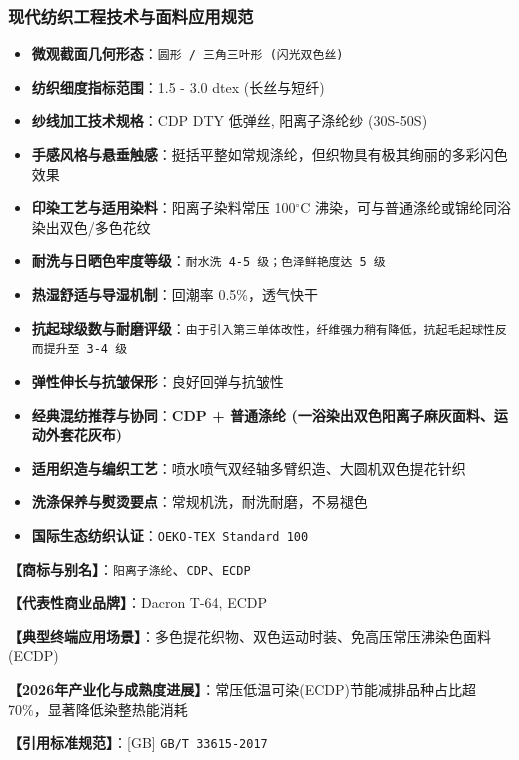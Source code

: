 \documentclass[11pt,openright,twoside,UTF8]{ctexbook}
\begin{document}
\subsubsection*{现代纺织工程技术与面料应用规范}
\begin{itemize} \setlength{\itemsep}{2pt}
    \item \textbf{微观截面几何形态}：\texttt{圆形 / 三角三叶形 (闪光双色丝)}
    \item \textbf{纺织细度指标范围}：1.5 - 3.0 dtex (长丝与短纤)
    \item \textbf{纱线加工技术规格}：CDP DTY 低弹丝, 阳离子涤纶纱 (30S-50S)
    \item \textbf{手感风格与悬垂触感}：挺括平整如常规涤纶，但织物具有极其绚丽的多彩闪色效果
    \item \textbf{印染工艺与适用染料}：阳离子染料常压 100$^\circ\mathrm{C}$ 沸染，可与普通涤纶或锦纶同浴染出双色/多色花纹
    \item \textbf{耐洗与日晒色牢度等级}：\texttt{耐水洗 4-5 级；色泽鲜艳度达 5 级}
    \item \textbf{热湿舒适与导湿机制}：回潮率 0.5\%，透气快干
    \item \textbf{抗起球级数与耐磨评级}：\texttt{由于引入第三单体改性，纤维强力稍有降低，抗起毛起球性反而提升至 3-4 级}
    \item \textbf{弹性伸长与抗皱保形}：良好回弹与抗皱性
    \item \textbf{经典混纺推荐与协同}：\textbf{CDP + 普通涤纶 (一浴染出双色阳离子麻灰面料、运动外套花灰布)}
    \item \textbf{适用织造与编织工艺}：喷水喷气双经轴多臂织造、大圆机双色提花针织
    \item \textbf{洗涤保养与熨烫要点}：常规机洗，耐洗耐磨，不易褪色
    \item \textbf{国际生态纺织认证}：\texttt{OEKO-TEX Standard 100}
\end{itemize}
\vspace{0.2cm}

\noindent\textbf{【商标与别名】}：\texttt{阳离子涤纶}、\texttt{CDP}、\texttt{ECDP}\par
\noindent\textbf{【代表性商业品牌】}：Dacron T-64, ECDP\par
\noindent\textbf{【典型终端应用场景】}：多色提花织物、双色运动时装、免高压常压沸染色面料 (ECDP)\par
\noindent\textbf{【2026年产业化与成熟度进展】}：常压低温可染(ECDP)节能减排品种占比超70\%，显著降低染整热能消耗\par
\noindent\textbf{【引用标准规范】}：[GB] \texttt{GB/T 33615-2017}\par
\vspace{0.5cm}
\end{document}
